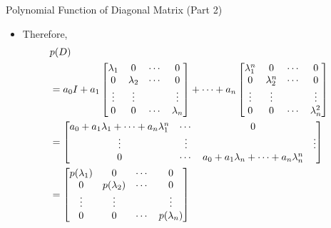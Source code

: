 \documentclass[usenames,dvipsnames,10pt]{beamer}
\begin{document}
\begin{frame}
  {Polynomial Function of Diagonal Matrix (Part 2)}

  \begin{itemize}
  \item Therefore,
    \begin{align*}
      \lefteqn{p(D)}\\
      &=a_0I + a_1
        \begin{bmatrix}
          \lambda_1 & 0 &\cdots & 0\\
          0 &\lambda_2 & \cdots & 0\\
          \vdots & \vdots & & \vdots\\
          0 & 0 & \cdots & \lambda_n
        \end{bmatrix}
        +\cdots+
        a_n
        \begin{bmatrix}
          \lambda_1^n & 0 &\cdots & 0\\
          0 &\lambda_2^n & \cdots & 0\\
          \vdots & \vdots & & \vdots\\
          0 & 0 & \cdots & \lambda_n^2
        \end{bmatrix}\\
      &= 
        \begin{bmatrix}
          a_0+a_1\lambda_1+\cdots+a_n\lambda_1^n  &\cdots & 0\\
          \vdots & \vdots & & \vdots\\
          0 & \cdots & a_0+a_1\lambda_n+\cdots+a_n\lambda_n^n
        \end{bmatrix}\\
      &= 
        \begin{bmatrix}
          p(\lambda_1) & 0 &\cdots & 0\\
          0 &p(\lambda_2) & \cdots & 0\\
          \vdots & \vdots & & \vdots\\
          0 & 0 & \cdots & p(\lambda_n)
        \end{bmatrix}
    \end{align*}
  \end{itemize}
\end{frame}
\end{document}
